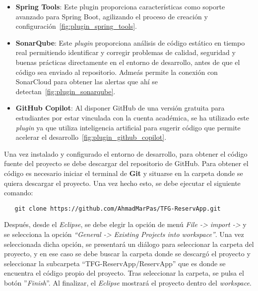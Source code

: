 \begin{itemize}
   \item \textbf{Spring Tools}: Este plugin proporciona características como soporte avanzado para Spring Boot, agilizando el proceso de creación y configuración~\ref{fig:plugin_spring_tools}.
   
   
   \item \textbf{SonarQube}: Este \emph{plugin} proporciona análisis de código estático en tiempo real permitiendo identificar y corregir problemas de calidad, seguridad y buenas prácticas directamente en el entorno de desarrollo, antes de que el código sea enviado al repositorio. Admeás permite la conexión con SonarCloud para obtener las alertas que ahí se detectan~\ref{fig:plugin_sonarqube}.

   
   \item \textbf{GitHub Copilot}: Al disponer GitHub de una versión gratuita para estudiantes por estar vinculada con la cuenta académica, se ha utilizado este \emph{plugin} ya que utiliza inteligencia
artificial para sugerir código que permite acelerar el desarrollo~\ref{fig:plugin_github_copilot}.


\end{itemize}


Una vez instalado y configurado el entorno de desarrollo, para obtener el código fuente del proyecto se debe descargar del repositorio de GitHub. Para obtener el código es necesario iniciar el terminal de \textbf{Git} y situarse en la carpeta donde se quiera descargar el proyecto. Una vez hecho esto, se debe ejecutar el siguiente comando:
\begin{verbatim}
   git clone https://github.com/AhmadMarPas/TFG-ReservApp.git
\end{verbatim}
Después, desde el \textit{Eclipse}, se debe elegir la opción de menú \emph{File -> import ->} y se selecciona la opción \emph{``General -> Existing Projects into workspace''}. Una vez seleccionada dicha opción, se presentará un diálogo para seleccionar la carpeta del proyecto, y en ese caso se debe buscar la carpeta donde se descargó el proyecto y seleccionar la subcarpeta ``TFG-ReservApp/ReservApp'' que es donde se encuentra el código propio del proyecto. Tras seleccionar la carpeta, se pulsa el botón ''\emph{Finish}''. Al finalizar, el \textit{Eclipse} mostrará el proyecto dentro del \emph{workspace}.

